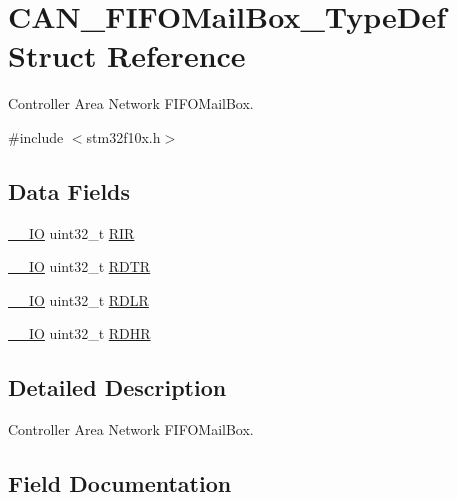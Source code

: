 \hypertarget{struct_c_a_n___f_i_f_o_mail_box___type_def}{}\section{C\+A\+N\+\_\+\+F\+I\+F\+O\+Mail\+Box\+\_\+\+Type\+Def Struct Reference}
\label{struct_c_a_n___f_i_f_o_mail_box___type_def}


Controller Area Network F\+I\+F\+O\+Mail\+Box.  




{\ttfamily \#include $<$stm32f10x.\+h$>$}

\subsection*{Data Fields}
\begin{DoxyCompactItemize}
\item 
\mbox{\hyperlink{core__sc300_8h_aec43007d9998a0a0e01faede4133d6be}{\+\_\+\+\_\+\+IO}} uint32\+\_\+t \mbox{\hyperlink{struct_c_a_n___f_i_f_o_mail_box___type_def_a0acc8eb90b17bef5b9e03c7ddaacfb0b}{R\+IR}}
\item 
\mbox{\hyperlink{core__sc300_8h_aec43007d9998a0a0e01faede4133d6be}{\+\_\+\+\_\+\+IO}} uint32\+\_\+t \mbox{\hyperlink{struct_c_a_n___f_i_f_o_mail_box___type_def_a9563d8a88d0db403b8357331bea83a2e}{R\+D\+TR}}
\item 
\mbox{\hyperlink{core__sc300_8h_aec43007d9998a0a0e01faede4133d6be}{\+\_\+\+\_\+\+IO}} uint32\+\_\+t \mbox{\hyperlink{struct_c_a_n___f_i_f_o_mail_box___type_def_ae1c569688eedd49219cd505b9c22121b}{R\+D\+LR}}
\item 
\mbox{\hyperlink{core__sc300_8h_aec43007d9998a0a0e01faede4133d6be}{\+\_\+\+\_\+\+IO}} uint32\+\_\+t \mbox{\hyperlink{struct_c_a_n___f_i_f_o_mail_box___type_def_a7f11f42ba9d3bc5cd4a4f5ea0214608e}{R\+D\+HR}}
\end{DoxyCompactItemize}


\subsection{Detailed Description}
Controller Area Network F\+I\+F\+O\+Mail\+Box. 

\subsection{Field Documentation}
\mbox{\label{struct_c_a_n___f_i_f_o_mail_box___type_def_a7f11f42ba9d3bc5cd4a4f5ea0214608e}} 
